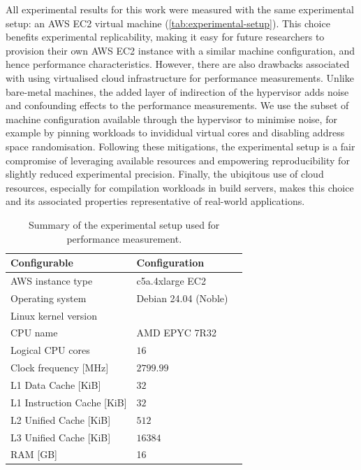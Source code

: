 All experimental results for this work were measured with the same experimental setup: an AWS EC2 virtual machine (\autoref{tab:experimental-setup}).
This choice benefits experimental replicability, making it easy for future researchers to provision their own AWS EC2 instance with a similar machine configuration, and hence performance characteristics.
However, there are also drawbacks associated with using virtualised cloud infrastructure for performance measurements.
Unlike bare-metal machines, the added layer of indirection of the hypervisor adds noise and confounding effects to the performance measurements.
We use the subset of machine configuration available through the hypervisor to minimise noise, for example by pinning workloads to invididual virtual cores and disabling address space randomisation. %
Following these mitigations, the experimental setup is a fair compromise of leveraging available resources and empowering reproducibility for slightly reduced experimental precision.
Finally, the ubiqitous use of cloud resources, especially for compilation workloads in build servers, makes this choice and its associated properties representative of real-world applications.

\begin{table}[H]
  \caption{Summary of the experimental setup used for performance measurement.}
  \label{tab:experimental-setup}
  \centering
  \begin{tabular}{lll}
    \toprule
    \textbf{Configurable} & \textbf{Configuration} \\
    \midrule
    AWS instance type & c5a.4xlarge EC2 \\
    Operating system & Debian 24.04 (Noble) \\
    Linux kernel version &  \\
    \midrule
    CPU name & AMD EPYC 7R32 \\
    Logical CPU cores & $16$ \\
    Clock frequency [MHz] & $2799.99$ \\
    L1 Data Cache [KiB] & $32$ \\
    L1 Instruction Cache [KiB] & $32$ \\
    L2 Unified Cache [KiB] & $512$ \\
    L3 Unified Cache [KiB] & $16384$ \\
    RAM [GB] & 16 \\
    \bottomrule
  \end{tabular}
\end{table}


